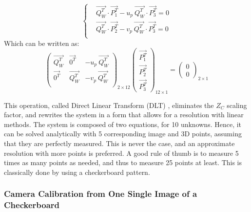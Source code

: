   \begin{equation}
    \begin{cases}
      & \overrightarrow{Q_W^T} \cdot \overrightarrow{P_1^T} - u_p \ \overrightarrow{Q_W^T} \cdot \overrightarrow{P_3^T} = 0\\
      & \overrightarrow{Q_W^T} \cdot \overrightarrow{P_2^T} - v_p \ \overrightarrow{Q_W^T} \cdot \overrightarrow{P_3^T} = 0\\
    \end{cases}
  \end{equation}
  Which can be written as:
  \begin{equation}\label{eq:calib}
    \boxed{
      \begin{pmatrix}
        \overrightarrow{Q_W^T} & \overrightarrow{0^T} & - u_p \ \overrightarrow{Q_W^T}\\   
        \overrightarrow{0^T} & \overrightarrow{Q_W^T} & - v_p \ \overrightarrow{Q_W^T} \\ 
      \end{pmatrix}_{\!\!2\times 12}
      \begin{pmatrix} \overrightarrow{P_1^T} \\ \overrightarrow{P_2^T} \\ \overrightarrow{P_3^T} \end{pmatrix}_{\!\!12\times 1}
      = \begin{pmatrix} 0 \\ 0 \end{pmatrix}_{\!\!2\times 1}
    }
  \end{equation}

This operation, called Direct Linear Transform (DLT) \cite{Sutherland1974}, eliminates the $Z_C$ scaling factor, and rewrites the system in a form that allows for a resolution with linear methods. The system is composed of two equations, for 10 unknowns. Hence, it can be solved analytically with 5 corresponding image and 3D points, assuming that they are perfectly measured. This is never the case, and an approximate resolution with more points is preferred. A good rule of thumb is to measure 5 times as many points as needed, and thus to measure 25 points at least. This is classically done by using a checkerboard pattern. 

\newpage
\subsubsection{Camera Calibration from One Single Image of a Checkerboard}

